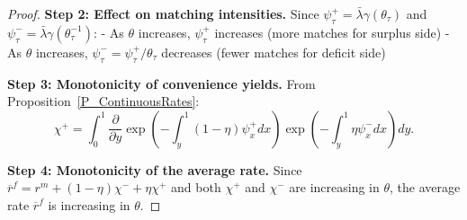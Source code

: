 \begin{proof}
\textbf{Step 2: Effect on matching intensities.} Since $\psi_{\tau}^{+} = \bar{\lambda}\gamma(\theta_{\tau})$ and $\psi_{\tau}^{-} = \bar{\lambda}\gamma(\theta_{\tau}^{-1})$:
- As $\theta$ increases, $\psi_{\tau}^{+}$ increases (more matches for surplus side)
- As $\theta$ increases, $\psi_{\tau}^{-} = \psi_{\tau}^{+}/\theta_{\tau}$ decreases (fewer matches for deficit side)

\textbf{Step 3: Monotonicity of convenience yields.} From Proposition~\ref{P_ContinuousRates}:
\[
\chi^{+} = \int_{0}^{1}\frac{\partial}{\partial y}\exp\left(-\int_{y}^{1} (1-\eta)\psi_{x}^{+}dx\right)\exp\left(-\int_{y}^{1}\eta\psi_{x}^{-}dx\right)dy.
\]

\textbf{Step 4: Monotonicity of the average rate.} Since $\overline{r}^{f} = r^{m} + (1-\eta)\chi^{-} + \eta\chi^{+}$ and both $\chi^{+}$ and $\chi^{-}$ are increasing in $\theta$, the average rate $\overline{r}^{f}$ is increasing in $\theta$.
\end{proof}